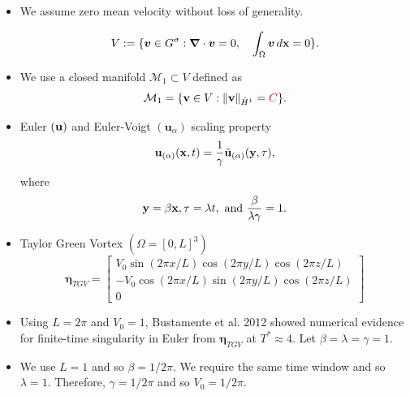 \documentclass{beamer}
\def\Bmp#1{ \begin{minipage}{#1} }
\def\Emp{ \end{minipage} }
\def\hdo{\dot{H}^1}
\def\M{{\mathcal{M}}}
\def\red#1{{\color{red}{ #1 }}}
\def\be{{\boldsymbol \eta}}
\def\v{{\bf v}}
\def\y{{\bf y}}
\def\x{{\bf x}}
\def\u{{\bf u}}
\def\ua{\boldsymbol u_\alpha}
\def\y{{\bf y}}
\begin{document}
\frame
{
\hspace*{-1.0cm}
\Bmp{12cm}
\raggedright

\begin{itemize}
\item<1->
We assume zero mean velocity without loss of generality.

\begin{equation*}
V := \{\boldsymbol v \in G^\sigma : \boldsymbol \nabla \cdot \boldsymbol v = 0, \quad \int_{\Omega}\boldsymbol v\, d\x = 0\}.
\end{equation*}

\item<2->
We use a closed manifold $\M_1 \subset V$ defined as
\begin{equation*}
\M_1 = \{\v \in V : \|\v\|_{\hdo} = \red{C}\}.
\end{equation*}

\item<3->
Euler $(\u)$ and Euler-Voigt $(\ua)$ scaling property
\begin{equation*}
\u_{(\alpha)}(\x,t) = \frac{1}{\gamma}\tilde{\u}_{(\alpha)}(\y,\tau),
\end{equation*}
where
\begin{equation*}
\y = \beta\x, \tau = \lambda t, \text{ and } \frac{\beta}{\lambda\gamma} = 1.
\end{equation*}

\end{itemize}
\Emp
}


\frame
{
\hspace*{-1.0cm}
\Bmp{12cm}
\raggedright

\begin{itemize}

\item<1->
Taylor Green Vortex $(\Omega = [0,L]^3)$
\begin{equation*}
\be_{TGV} = \begin{bmatrix}
V_0\sin(2\pi x/L)\cos(2\pi y/L)\cos(2\pi z/L) \\
-V_0\cos(2\pi x/L)\sin(2\pi y/L)\cos(2\pi z/L) \\
0
\end{bmatrix}
\end{equation*}
\smallskip

\item<2->
Using $L = 2\pi$ and $V_0 = 1$, Bustamente et al. 2012 showed numerical evidence for finite-time singularity in Euler from $\be_{TGV}$ at $T^* \approx 4$. Let $\beta = \lambda = \gamma = 1$.
\smallskip

\item<3->
We use $L = 1$ and so $\beta = 1/2\pi$. We require the same time window and so $\lambda = 1$. Therefore, $\gamma = 1/2\pi$ and so $V_0 = 1/2\pi$.  

\end{itemize}
\Emp
}
\end{document}
